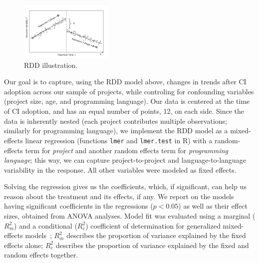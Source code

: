 \begin{figure}[t]
	\centering
	\includegraphics[width=0.4\textwidth, clip=true, trim=0 15 15 50]{RDD_plot.png}
	\caption{RDD illustration.}
	\label{RDDIllustration}
\end{figure}

Our goal is to capture, using the RDD model above, changes in trends after CI 
adoption across our sample of projects, while controling for confounding variables 
(\eg project size, age, and programming language).
Our data is centered at the time of CI adoption, and has an equal number of points, 
12, on each side.
Since the data is inherently nested (each project contributes multiple observations; 
similarly for programming language), we implement the RDD model as a 
mixed-effects linear regression (functions \texttt{lmer} and \texttt{lmer.test} in R) 
with a random-effects term for \emph{project} and another random effects term 
for \emph{programming language}; this way, we can capture project-to-project and 
language-to-language variability in the response.
All other variables were modeled as fixed effects.

Solving the regression gives us the coefficients, which, if significant, can help 
us reason about the treatment and its effects, if any.
We report on the models having significant coefficients in the regressions 
($p < 0.05$) as well as their effect sizes, obtained from ANOVA analyses.
Model fit was evaluated using a marginal ($R^2_m$) and a conditional ($R^2_c$) 
coefficient of determination for generalized mixed-effects 
models~\cite{nakagawa2013general, johnson2014extension}; $R^2_m$ describes 
the proportion of variance explained by the fixed effects alone; $R^2_c$ describes 
the proportion of variance explained by the fixed and random effects together.


